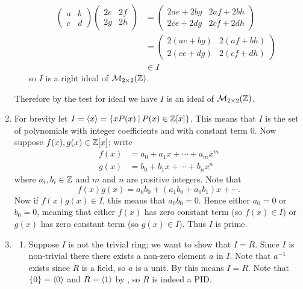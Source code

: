 \begin{enumerate}
\begin{itemize}
        \begin{align*}
            \begin{pmatrix}a&b\\c&d\end{pmatrix}\begin{pmatrix}2e&2f\\2g&2h\end{pmatrix} &= \begin{pmatrix}2ae+2bg&2af+2bh\\2ce+2dg&2cf+2dh\end{pmatrix}\\
            &= \begin{pmatrix}2(ae+bg)&2(af+bh)\\2(ce+dg)&2(cf+dh)\end{pmatrix}\\
            &\in I
        \end{align*}
        so $I$ is a right ideal of $\mathcal{M}_{2\times2}(\mathbb{Z})$.
    \end{itemize}
    Therefore by the test for ideal we have $I$ is an ideal of $\mathcal{M}_{2\times2}(\mathbb{Z})$.

    \item For brevity let $I = \princ{x} = \{xP(x) \vert P(x) \in \Z[x]\}$. This means that $I$ is the set of polynomials with integer coefficients and with constant term 0. Now suppose $f(x), g(x) \in \mathbb{Z}[x]$; write
    \begin{align*}
        f(x) &= a_0 + a_1x + \cdots + a_mx^m\\
        g(x) &= b_0 + b_1x + \cdots + b_nx^n
    \end{align*}
    where $a_i, b_i \in \mathbb{Z}$ and $m$ and $n$ are positive integers. Note that
    \[
        f(x)g(x) = a_0b_0 + (a_1b_0+a_0b_1)x + \cdots.
    \]
    Now if $f(x)g(x) \in I$, this means that $a_0b_0 = 0$. Hence either $a_0 = 0$ or $b_0 = 0$, meaning that either $f(x)$ has zero constant term (so $f(x) \in I$) or $g(x)$ has zero constant term (so $g(x) \in I$). Thus $I$ is prime.

    \item \begin{enumerate}[label=(\alph*)]
        \item Suppose $I$ is not the trivial ring; we want to show that $I = R$. Since $I$ is non-trivial there there exists a non-zero element $a$ in $I$. Note that $a^{-1}$ exists since $R$ is a field, so $a$ is a unit. By  this means $I = R$. Note that $\{0\} = \left\langle0\right\rangle$ and $R = \left\langle1\right\rangle$ by , so $R$ is indeed a PID.


\end{enumerate}
\end{enumerate}
